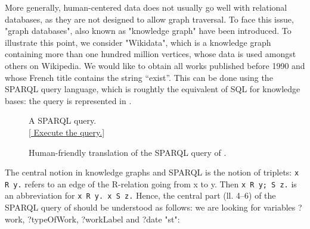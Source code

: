 More generally, human-centered data does not usually go well with
relational databases, as they are not designed to allow graph traversal.
To face this issue, "graph databases", also known as "knowledge graph" have
been introduced. To illustrate this point, we consider
"Wikidata", which is a knowledge graph containing more than one hundred million
vertices, whose data is used amongst others on Wikipedia. 
We would like to obtain all works published before 1990 and whose
French title contains the string ``exist''.
This can be done using the SPARQL query language, which is roughtly the equivalent
of SQL for knowledge bases: the query is represented in .
\begin{figure}

	\caption{
		\label{fig:sparql}
		A SPARQL query.\\
	\href{https://query.wikidata.org/\#SELECT\%20\%3FworkLabel\%20\%3FauthorLabel\%0AWHERE\%0A\%7B\%0A\%20\%20\%3Fwork\%09wdt\%3AP31\%2Fwdt\%3AP279\%2a\%20wd\%3AQ133449656\%3B\%0A\%20\%20\%09\%09rdfs\%3Alabel\%20\%3FworkLabel\%3B\%0A\%20\%20\%09\%09wdt\%3AP577\%20\%3Fdate\%3B\%0A\%20\%20\%20\%20\%20\%20\%20\%20wdt\%3AP50\%20\%3Fauthor.\%0A\%20\%20\%3Fauthor\%20rdfs\%3Alabel\%20\%3FauthorLabel.\%0A\%20\%20FILTER\%28LANG\%28\%3FworkLabel\%29\%20\%3D\%20\%22fr\%22\%20\%26\%26\%20LANG\%28\%3FauthorLabel\%29\%20\%3D\%20\%22fr\%22\%29.\%0A\%20\%20FILTER\%28CONTAINS\%28\%3FworkLabel\%2C\%20\%22exist\%22\%29\%29.\%0A\%20\%20FILTER\%28YEAR\%28\%3Fdate\%29\%20\%3C\%3D\%201990\%29.\%0A\%7D\%0ALIMIT\%207}{[\raisebox{-.4ex}{\HandRight} Execute the query.]}
	}
\end{figure}
\begin{figure}
	
	\caption{
		\label{fig:sparql-explained}
		Human-friendly translation of the SPARQL query of .
	}
\end{figure}
The central notion in knowledge graphs and SPARQL is the notion of triplets:
\lstinline[language=SQL]{x R y.} refers to an edge of the \textsf{R}-relation
going from \textsf{x} to \textsf{y}.
Then \lstinline[language=SQL]{x R y; S z.} is an abbreviation for
\lstinline[language=SQL]{x R y. x S z.}
Hence, the central part (ll. 4--6) of the SPARQL query of 
should be understood as follows:
we are looking for variables \textsf{?work}, \textsf{?typeOfWork},
\textsf{?workLabel} and \textsf{?date} "st":
